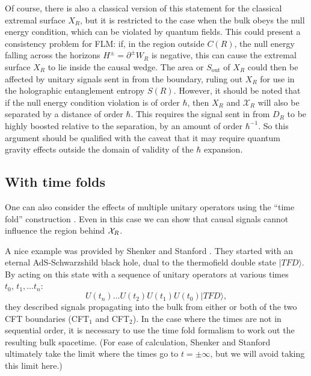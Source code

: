 \documentclass[12pt]{article}
\theoremstyle{remark}
\numberwithin{equation}{section}
\numberwithin{equation}{section}
\begin{document}
Of course, there is also a classical version of this statement for the classical extremal surface $X_R$, but it is restricted to the case when the 
bulk
obeys the null energy condition, which can be violated by quantum fields.  This could present a consistency problem for FLM: if, in the region outside $C(R)$, the null energy falling across the horizons $H^\pm = \partial^\pm W_R$ is negative, this can cause the extremal surface $X_R$ to lie inside the causal wedge.  The area or $S_\mathrm{out}$ of $X_R$ could then be affected by unitary signals sent in from the boundary, ruling out $X_R$ for use in the holographic entanglement entropy $S(R)$.  However, it should be noted that if the null energy condition violation is of order $\hbar$, then $X_R$ and $\mathcal{X}_R$ will also be separated by a distance of order $\hbar$.  This requires the signal sent in from $D_R$ to be highly boosted relative to the separation, by an amount of order $\hbar^{-1}$.  So this argument should be qualified with the caveat that it may require quantum gravity effects outside the domain of validity of the $\hbar$ expansion.

\subsection{With time folds}

One can also consider the effects of multiple unitary operators using the ``time fold'' construction \cite{MarolfPolchinski}.  Even in this case we can show that causal signals cannot influence the region behind ${\cal X}_R$.

A nice example was provided by Shenker and Stanford \cite{ShenkerStanford}.  They started with an eternal AdS-Schwarzshild black hole, dual to the thermofield double state $|TFD\rangle$.  By acting on this state with a sequence of unitary operators at various times $t_0,\,t_1,\ldots t_n$:
\begin{equation}\label{U's}
U(t_n) \ldots U(t_2) U(t_1) U(t_0) |TFD\rangle,
\end{equation}
they described signals propagating into the bulk from either or both of the two CFT boundaries (CFT$_1$ and CFT$_2$).  In the case where the times are not in sequential order, it is necessary to use the time fold formalism \cite{MarolfPolchinski} to work out the resulting bulk spacetime.  (For ease of calculation, Shenker and Stanford ultimately take the limit where the times go to $t = \pm \infty$, but we will avoid taking this limit here.)
\end{document}
